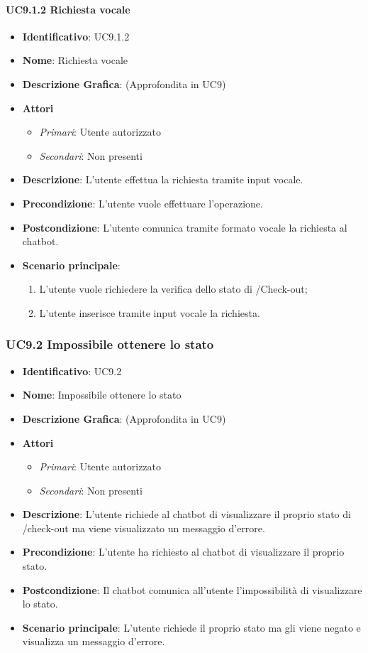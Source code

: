 \paragraph{UC9.1.2 Richiesta vocale}
\begin{itemize}
	\item \textbf{Identificativo}: UC9.1.2
	\item \textbf{Nome}: Richiesta vocale
	\item \textbf{Descrizione Grafica}: (Approfondita in UC9)
	\item \textbf{Attori}
	\begin{itemize}
		\item \textit{Primari}: Utente autorizzato
		\item \textit{Secondari}: Non presenti
	\end{itemize}
	\item \textbf{Descrizione}: L'utente effettua la richiesta tramite input vocale.
	\item \textbf{Precondizione}: L'utente vuole effettuare l'operazione.
	\item \textbf{Postcondizione}: L'utente comunica tramite formato vocale la richiesta al chatbot.
	\item \textbf{Scenario principale}: 
	\begin{enumerate}
		\item L'utente vuole richiedere la verifica dello stato di /Check-out;
		\item L'utente inserisce tramite input vocale la richiesta.
	\end{enumerate}
\end{itemize}

\subsubsection{UC9.2 Impossibile ottenere lo stato}
\begin{itemize}
	\item \textbf{Identificativo}: UC9.2
	\item \textbf{Nome}: Impossibile ottenere lo stato
	\item \textbf{Descrizione Grafica}: (Approfondita in UC9)
	\item \textbf{Attori}
	\begin{itemize}
		\item \textit{Primari}: Utente autorizzato
		\item \textit{Secondari}: Non presenti
	\end{itemize}
	\item \textbf{Descrizione}: L'utente richiede al chatbot di visualizzare il proprio stato di /check-out ma viene visualizzato un messaggio d'errore.
	\item \textbf{Precondizione}: L'utente ha richiesto al chatbot di visualizzare il proprio stato.
	\item \textbf{Postcondizione}: Il chatbot comunica all'utente l'impossibilità di visualizzare lo stato.
	\item \textbf{Scenario principale}: L'utente richiede il proprio stato ma gli viene negato e visualizza un messaggio d'errore.
\end{itemize}